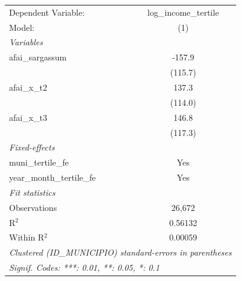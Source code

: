 \begingroup
\centering
\begin{tabular}{lc}
   \tabularnewline \midrule \midrule
   Dependent Variable:         & log\_income\_tertile\\    
   Model:                      & (1)\\  
   \midrule
   \emph{Variables}\\
   afai\_sargassum             & -157.9\\   
                               & (115.7)\\   
   afai\_x\_t2                 & 137.3\\   
                               & (114.0)\\   
   afai\_x\_t3                 & 146.8\\   
                               & (117.3)\\   
   \midrule
   \emph{Fixed-effects}\\
   muni\_tertile\_fe           & Yes\\  
   year\_month\_tertile\_fe    & Yes\\  
   \midrule
   \emph{Fit statistics}\\
   Observations                & 26,672\\  
   R$^2$                       & 0.56132\\  
   Within R$^2$                & 0.00059\\  
   \midrule \midrule
   \multicolumn{2}{l}{\emph{Clustered (ID\_MUNICIPIO) standard-errors in parentheses}}\\
   \multicolumn{2}{l}{\emph{Signif. Codes: ***: 0.01, **: 0.05, *: 0.1}}\\
\end{tabular}
\par\endgroup
